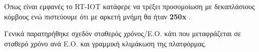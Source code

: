 Όπως είναι εμφανές το RT-IOT κατάφερε να τρέξει προσομοίωση με δεκαπλάσιους κόμβους ενώ πιστεύουμε ότι με αρκετή μνήμη θα ήταν \textbf{250x} .

Γενικά παρατηρήθηκε σχεδόν σταθερός χρόνος/Ε.Ο. κάτι που μεταφράζεται σε σταθερό χρόνο ανά Ε.Ο. και γραμμική κλιμάκωση της πλατφόρμας.


